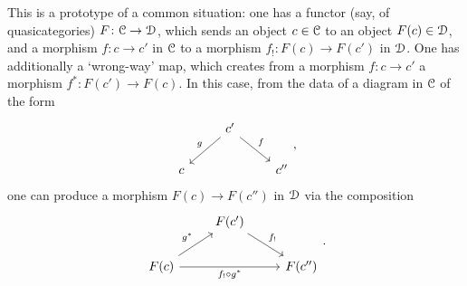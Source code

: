 \documentclass[main.tex]{subfiles}
\begin{document}
This is a prototype of a common situation: one has a functor (say, of quasicategories) $F\colon \mathcal{C} \to \mathcal{D}$, which sends an object $c \in \mathcal{C}$ to an object $F(c) \in \mathcal{D}$, and a morphism $f\colon c \to c'$ in $\mathcal{C}$ to a morphism $f_{!}\colon F(c) \to F(c')$ in $\mathcal{D}$. One has additionally a `wrong-way' map, which creates from a morphism $f\colon c \to c'$ a morphism $f^{*}\colon F(c') \to F(c)$. In this case, from the data of a diagram in $\mathcal{C}$ of the form
\begin{equation}
  \label{eq:span}
  \begin{tikzcd}
    & c'
    \arrow[dl, swap, "g"]
    \arrow[dr, "f"]
    \\
    c
    && c''
  \end{tikzcd},
\end{equation}
one can produce a morphism $F(c) \to F(c'')$ in $\mathcal{D}$ via the composition
\begin{equation*}
  \begin{tikzcd}
    & F(c')
    \arrow[dr, "f_{!}"]
    \\
    F(c)
    \arrow[ur, "g^{*}"]
    \arrow[rr, swap, "f_{!} \circ g^{*}"]
    && F(c'')
  \end{tikzcd}.
\end{equation*}
\end{document}
